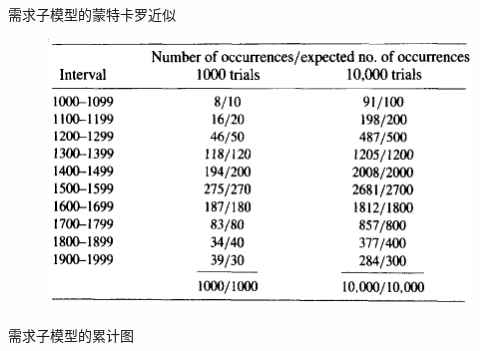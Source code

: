 \documentclass[UTF8]{ctexbeamer}
\begin{document}
\begin{frame}{需求子模型的蒙特卡罗近似}
  \begin{figure}
    \includegraphics[width=.7\textwidth{}]{gas-mtkl.png}
  \end{figure}  
\end{frame}

\begin{frame}{需求子模型的累计图}
  \begin{figure}
    \setcounter{subfigure}{0}{}
  \end{figure}
\end{frame}
\end{document}

